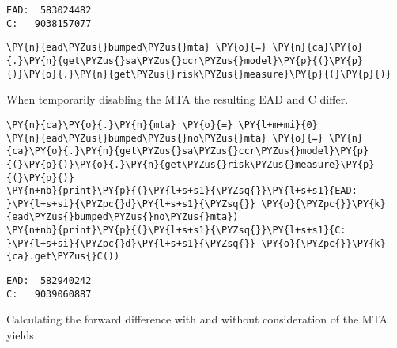     \begin{Verbatim}[commandchars=\\\{\}]
EAD:  583024482
C:   9038157077
    \end{Verbatim}

    \begin{tcolorbox}[breakable, size=fbox, boxrule=1pt, pad at break*=1mm,colback=cellbackground, colframe=cellborder]
\begin{Verbatim}[commandchars=\\\{\}]
\PY{n}{ead\PYZus{}bumped\PYZus{}mta} \PY{o}{=} \PY{n}{ca}\PY{o}{.}\PY{n}{get\PYZus{}sa\PYZus{}ccr\PYZus{}model}\PY{p}{(}\PY{p}{)}\PY{o}{.}\PY{n}{get\PYZus{}risk\PYZus{}measure}\PY{p}{(}\PY{p}{)}
\end{Verbatim}
\end{tcolorbox}

    When temporarily disabling the MTA the resulting EAD and C differ.

    \begin{tcolorbox}[breakable, size=fbox, boxrule=1pt, pad at break*=1mm,colback=cellbackground, colframe=cellborder]
\begin{Verbatim}[commandchars=\\\{\}]
\PY{n}{ca}\PY{o}{.}\PY{n}{mta} \PY{o}{=} \PY{l+m+mi}{0}
\PY{n}{ead\PYZus{}bumped\PYZus{}no\PYZus{}mta} \PY{o}{=} \PY{n}{ca}\PY{o}{.}\PY{n}{get\PYZus{}sa\PYZus{}ccr\PYZus{}model}\PY{p}{(}\PY{p}{)}\PY{o}{.}\PY{n}{get\PYZus{}risk\PYZus{}measure}\PY{p}{(}\PY{p}{)}
\PY{n+nb}{print}\PY{p}{(}\PY{l+s+s1}{\PYZsq{}}\PY{l+s+s1}{EAD:  }\PY{l+s+si}{\PYZpc{}d}\PY{l+s+s1}{\PYZsq{}} \PY{o}{\PYZpc{}}\PY{k}{ead\PYZus{}bumped\PYZus{}no\PYZus{}mta})
\PY{n+nb}{print}\PY{p}{(}\PY{l+s+s1}{\PYZsq{}}\PY{l+s+s1}{C:   }\PY{l+s+si}{\PYZpc{}d}\PY{l+s+s1}{\PYZsq{}} \PY{o}{\PYZpc{}}\PY{k}{ca}.get\PYZus{}C())
\end{Verbatim}
\end{tcolorbox}

    \begin{Verbatim}[commandchars=\\\{\}]
EAD:  582940242
C:   9039060887
    \end{Verbatim}

    Calculating the forward difference with and without consideration of the
MTA yields

